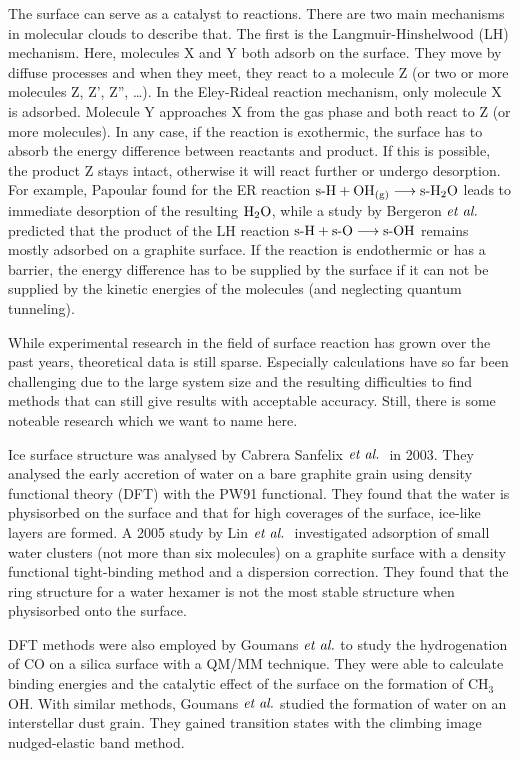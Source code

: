 \documentclass[8.5pt,twoside,twocolumn]{article}
\newcommand\sur{\enmat{\te{s-}}}
\newcommand\gas{\enmat{_\te{(g)}}}
\theoremstyle{standard}
\begin{document}
The surface can serve as a catalyst to reactions. There are two main mechanisms
in molecular clouds to describe that. The first is the Langmuir-Hinshelwood (LH)
mechanism. Here, molecules X and Y both adsorb on the surface. They move
by diffuse processes and when they meet, they react to a
molecule Z (or two or more molecules Z, Z', Z'', \ldots).
In the Eley-Rideal reaction mechanism, only molecule X is adsorbed. Molecule Y approaches X from the gas
phase and both react to Z (or more molecules). In any case, if the
reaction is exothermic, the surface has to absorb the energy difference between
reactants and product. If this is possible, the product Z stays intact,
otherwise it will react further or undergo desorption. For example, Papoular
\cite{Papoular2005} found for the ER reaction $\sur{\te
H}+{\ho}\gas\chemar\sur{\hto}$ leads to immediate desorption of the resulting
$\text H _2 \text O$, while a study by Bergeron $\emph{et al.}$ predicted that the product of the LH
reaction $\sur{\te H}+\sur{\te O}\chemar\sur{\ho}$ remains mostly adsorbed on a
graphite surface\cite{BergeronRougeauSidisEtAl2008}.
If the reaction is endothermic or has a barrier, the energy difference has to
be supplied by the surface if it can not be supplied by the kinetic energies of
the molecules (and neglecting quantum tunneling).

While experimental research in the field of surface reaction has grown over the
past years, theoretical data is still sparse. Especially 
calculations have so far been challenging due to the large system size and the
resulting difficulties to find methods that can still give results with
acceptable accuracy. Still, there is some noteable research which we want to
name here.

Ice surface structure was analysed by Cabrera Sanfelix $\emph{et al.}~$ 
\cite{CabreraSanfelix2003} in 2003. They analysed the early accretion of water
on a bare graphite grain using density functional theory (DFT) with the PW91
functional. They found that the water is physisorbed on the surface and that
for high coverages of the surface, ice-like layers are formed. A 2005 study by
Lin $\emph{et al.}~$ \cite{LinZhangLeeEtAl2005} investigated adsorption of small water clusters
(not more than six molecules) on a graphite surface with a density functional
tight-binding method and a dispersion correction. They found that the ring
structure for a water hexamer is not the most stable structure when physisorbed
onto the surface.

DFT methods were also employed by Goumans $\emph{et al.}$\cite{GoumansCatlowBrown2008}
to study the hydrogenation of CO on a silica surface with a QM/MM technique.
They were able to calculate binding energies and the catalytic effect of the
surface on the formation of CH$_3$OH. With similar methods, Goumans $\emph{et al.}$
\cite{GoumansCatlowBrownEtAl2009} studied the formation of water on an
interstellar dust grain. They gained transition states with the climbing image
nudged-elastic band method\cite{HenkelmanUberuagaJonsson2000}.
\end{document}
